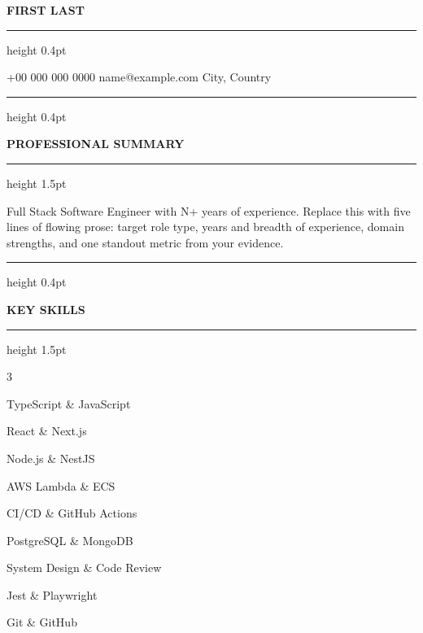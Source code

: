 \documentclass[a4paper,10pt]{article}
\newcommand{\bodyfont}{\fontsize{10.6}{13.1}\selectfont}
\newcommand{\Cap}[1]{{\fontsize{12}{13}\selectfont #1}}
\newcommand{\NameCap}[1]{{\fontsize{18}{20}\selectfont #1}}
\newcommand{\rsection}[1]{%
  \par\vspace{7pt}%
  {\color{textblack}\hrule height 0.4pt}%
  \vspace{3.5pt}%
  \centerline{\bfseries\fontsize{9.5}{13}\selectfont\MakeUppercase{#1}}%
  \vspace{2.5pt}%
  {\color{textblack}\hrule height 1.5pt}%
  \vspace{7pt}%
  \bodyfont
}
\begin{document}
\justifying
\setlength{\parindent}{0pt}

\begin{center}
  {\bfseries\fontsize{14.5}{20}\selectfont\pdfinterwordspaceoff\MakeUppercase{\NameCap{F}irst\pdffakespace{} \NameCap{L}ast}}\pdfinterwordspaceon
\end{center}
\vspace{-4pt}
{\color{textblack}\hrule height 0.4pt}
\vspace{4pt}
\begin{center}
  {\fontsize{10}{12}\selectfont +00 000 000 0000 \textbar{} name@example.com \textbar{} City, Country}
\end{center}
\vspace{-2pt}

\rsection{\Cap{P}rofessional \Cap{S}ummary}
{\fontsize{10.6}{15}\selectfont
\frenchspacing %
Full Stack Software Engineer with N+ years of experience. Replace this with five lines of flowing prose: target role type, years and breadth of experience, domain strengths, and one standout metric from your evidence.\par}

\rsection{\Cap{K}ey \Cap{S}kills}
\begin{paracol}{3}
\begin{skilllist}
\raggedright
  \item TypeScript \& JavaScript
  \item React \& Next.js
  \item Node.js \& NestJS
\end{skilllist}
\switchcolumn
\begin{skilllist}
\raggedright
  \item AWS Lambda \& ECS
  \item CI/CD \& GitHub Actions
  \item PostgreSQL \& MongoDB
\end{skilllist}
\switchcolumn
\begin{skilllist}
\raggedright
  \item System Design \& Code Review
  \item Jest \& Playwright
  \item Git \& GitHub
\end{skilllist}
\end{paracol}
\end{document}
